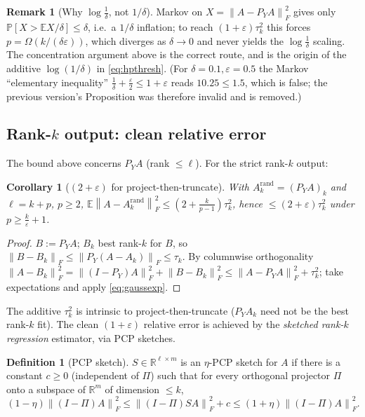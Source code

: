 \documentclass{amsart}
\newtheorem{corollary}{Corollary}
\theoremstyle{definition}
\newtheorem{definition}{Definition}
\newtheorem{remark}{Remark}
\newcommand{\R}{\mathbb{R}}
\newcommand{\Frob}[1]{\left\lVert #1\right\rVert_F}
\newcommand{\E}{\mathbb{E}}
\newcommand{\Prob}{\mathbb{P}}
\begin{document}
\begin{remark}[Why $\log\tfrac1\delta$, not $1/\delta$]\label{rem:nomarkov}
Markov on $X=\Frob{A-P_YA}^2$ gives only $\Prob[X>\E X/\delta]\le\delta$, i.e.\
a $1/\delta$ inflation; to reach $(1+\varepsilon)\tau_k^2$ this forces
$p=\Omega(k/(\delta\varepsilon))$, which diverges as $\delta\to0$ and never
yields the $\log\tfrac1\delta$ scaling. The concentration argument above is the
correct route, and is the origin of the additive $\log(1/\delta)$ in
\eqref{eq:hpthresh}. (For $\delta=0.1,\varepsilon=0.5$ the Markov ``elementary
inequality'' $\tfrac1\delta+\tfrac\varepsilon2\le1+\varepsilon$ reads
$10.25\le1.5$, which is false; the previous version's Proposition was therefore
invalid and is removed.)
\end{remark}

\subsection{Rank-$k$ output: clean relative error}\label{sec:rankk}

The bound above concerns $P_YA$ (rank $\le\ell$). For the strict rank-$k$ output:

\begin{corollary}[$(2+\varepsilon)$ for project-then-truncate]\label{cor:rankk}
With $A_k^{\mathrm{rand}}=(P_YA)_k$ and $\ell=k+p$, $p\ge2$,
$\E\Frob{A-A_k^{\mathrm{rand}}}^2\le(2+\tfrac{k}{p-1})\tau_k^2$, hence
$\le(2+\varepsilon)\tau_k^2$ under $p\ge\frac k\varepsilon+1$.
\end{corollary}

\begin{proof}
$B:=P_YA$; $B_k$ best rank-$k$ for $B$, so $\Frob{B-B_k}\le\Frob{P_Y(A-A_k)}
\le\tau_k$. By columnwise orthogonality
$\Frob{A-B_k}^2=\Frob{(I-P_Y)A}^2+\Frob{B-B_k}^2\le\Frob{A-P_YA}^2+\tau_k^2$;
take expectations and apply \eqref{eq:gaussexp}.
\end{proof}

The additive $\tau_k^2$ is intrinsic to project-then-truncate ($P_YA_k$ need not
be the best rank-$k$ fit). The clean $(1+\varepsilon)$ relative error is achieved
by the \emph{sketched rank-$k$ regression} estimator, via PCP sketches.

\begin{definition}[PCP sketch]\label{def:pcp}
$S\in\R^{\ell\times m}$ is an $\eta$-PCP sketch for $A$ if there is a constant
$c\ge0$ (independent of $\Pi$) such that for every orthogonal projector $\Pi$
onto a subspace of $\R^m$ of dimension $\le k$,
\begin{equation}\label{eq:pcpdef}
(1-\eta)\Frob{(I-\Pi)A}^2\le\Frob{(I-\Pi)SA}^2+c\le(1+\eta)\Frob{(I-\Pi)A}^2 .
\end{equation}
\end{definition}
\end{document}
